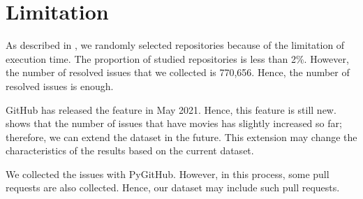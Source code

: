 \section{Limitation}
\label{sec:limitation}

As described in , we randomly selected 
repositories because of the limitation of execution time. 
The proportion of studied repositories is less than 2\%. 
However, the number of resolved issues that 
we collected is 770,656. 
Hence, the number of resolved issues is enough. 

GitHub has released the feature in May 2021. 
Hence, this feature is still new. 
 shows that the number of 
issues that have movies has slightly increased so far; 
therefore, we can extend the dataset in the future. 
This extension may change the characteristics of 
the results based on the current dataset. 

We collected the issues with PyGitHub. 
However, in this process, some pull requests 
are also collected. 
Hence, our dataset may include such pull requests. 